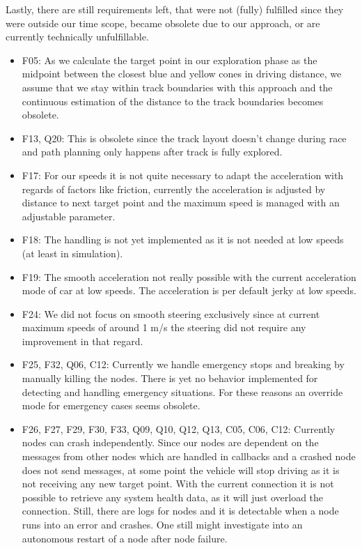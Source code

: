 Lastly, there are still requirements left, that were not (fully) fulfilled since they were outside our time scope, became obsolete due to our approach, or are currently technically unfulfillable.
\begin{itemize}
	\item F05: As we calculate the target point in our exploration phase as the midpoint between the closest blue and yellow cones in driving distance, we assume that we stay within track boundaries with this approach and the continuous estimation of the distance to the track boundaries becomes obsolete.
	\item F13, Q20: This is obsolete since the track layout doesn't change during race and path planning only happens after track is fully explored. 
	\item F17: For our speeds it is not quite necessary to adapt the acceleration with regards of factors like friction, currently the acceleration is adjusted by distance to next target point and the maximum speed is managed with an adjustable parameter.
	\item F18: The handling is not yet implemented as it is not needed at low speeds (at least in simulation).
	\item F19: The smooth acceleration not really possible with the current acceleration mode of car at low speeds. The acceleration is per default jerky at low speeds.
	\item F24: We did not focus on smooth steering exclusively since at current maximum speeds of around 1 m/s the steering did not require any improvement in that regard.
	\item F25, F32, Q06, C12: Currently we handle emergency stops and breaking by manually killing the nodes. There is yet no behavior implemented for detecting and handling emergency situations. For these reasons an override mode for emergency cases seems obsolete.
	\item F26, F27, F29, F30, F33, Q09, Q10, Q12, Q13, C05, C06, C12: Currently nodes can crash independently. Since our nodes are dependent on the messages from other nodes which are handled in callbacks and a crashed node does not send messages, at some point the vehicle will stop driving as it is not receiving any new target point. With the current connection it is not possible to retrieve any system health data, as it will just overload the connection. Still, there are logs for nodes and it is detectable when a node runs into an error and crashes. One still might investigate into an autonomous restart of a node after node failure.

\end{itemize}
